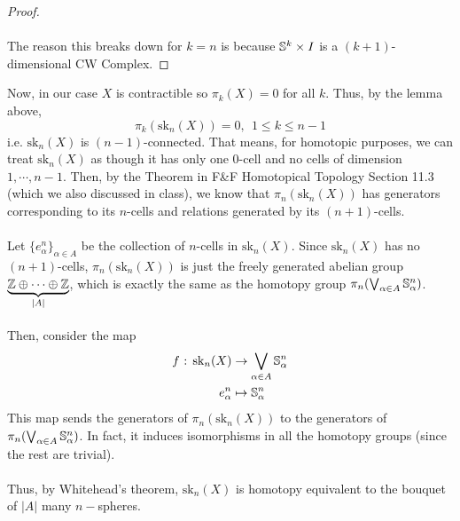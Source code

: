 \documentclass[11pt]{article}
\begin{document}
\begin{dottedbox}
\begin{proof}
    \\
    \\
    The reason this breaks down for $k=n$ is because $\mathbb{S}^k \times I$ is a $(k+1)$-dimensional CW Complex.
  \end{proof}
\end{dottedbox}

\vskip 0.5cm
Now, in our case $X$ is contractible so $\pi_k(X) = 0$ for all $k$. Thus, by the lemma above, $$ \pi_k(\mathrm{sk}_n(X)) = 0,~~ 1 \leq k \leq n-1 $$ i.e. $\mathrm{sk}_n(X)$ is $(n-1)$-connected. That means, for homotopic purposes, we can treat $\mathrm{sk}_n(X)$ as though it has only one $0$-cell and no cells of dimension $1, \cdots, n-1$. Then, by the Theorem in F\&F Homotopical Topology Section 11.3 (which we also discussed in class), we know that $\pi_n(\mathrm{sk}_n(X))$ has generators corresponding to its $n$-cells and relations generated by its $(n+1)$-cells.
\\
\\
Let $\{e_{\alpha}^n\}_{\alpha \in A}$ be the collection of $n$-cells in $\mathrm{sk}_n(X)$. Since $\mathrm{sk}_n(X)$ has no $(n+1)$-cells, $\pi_n(\mathrm{sk}_n(X))$ is just the freely generated abelian group $\underbrace{\mathbb{Z} \oplus \cdots \oplus \mathbb{Z}}_{|A|}$, which is exactly the same as the homotopy group $\pi_n(\bigvee_{\alpha \in A} \mathbb{S}_{\alpha}^n)$.
\\
\\
Then, consider the map
\begin{align}
  f \text{ : } \mathrm{sk}_n(X) &\rightarrow \bigvee_{\alpha \in A} \mathbb{S}_{\alpha}^n \\
  e_{\alpha}^n &\mapsto \mathbb{S}_{\alpha}^n
\end{align}
This map sends the generators of $\pi_n(\mathrm{sk}_n(X))$ to the generators of $\pi_n(\bigvee_{\alpha \in A} \mathbb{S}_{\alpha}^n )$. In fact, it induces isomorphisms in all the homotopy groups (since the rest are trivial).
\\
\\
Thus, by Whitehead's theorem, $\mathrm{sk}_n(X)$ is homotopy equivalent to the bouquet of $|A|$ many $n-$spheres.
\end{document}
